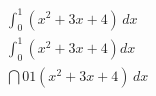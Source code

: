 
\begin{align*}
  \int_0^1 (x^2 + 3x + 4)\,dx\\
  \int_0^1 (x^2 + 3x + 4) dx\\
  \dint{0}{1} (x^2+3x+4)\,dx
\end{align*}
